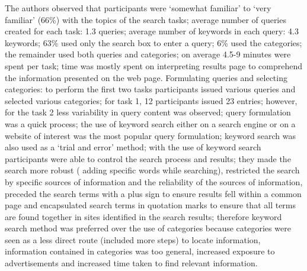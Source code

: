 \documentclass[]{article}
\begin{document}
The authors observed that participants were ‘somewhat familiar’ to ‘very familiar’ (66\%) with the topics of the search tasks; average number of queries created for each task: 1.3 queries; average number of keywords in each query: 4.3 keywords; 63\% used only the search box to enter a query; 6\% used the categories; the remainder used both queries and categories; on average 4.5-9 minutes were spent per task; time was mostly spent on interpreting results page to comprehend the information presented on the web page. Formulating queries and selecting categories: to perform the first two tasks participants issued various queries and selected various categories; for task 1, 12 participants issued 23 entries; however, for the task 2 less variability in query content was observed; query formulation was a quick process; the use of keyword search either on a search engine or on a website of interest was the most popular query formulation; keyword search was also used as a ‘trial and error’ method; with the use of keyword search participants were able to control the search process and results; they made the search more robust ( adding specific words while searching), restricted the search by specific sources of information and the reliability of the sources of information,  preceded the search terms with a plus sign to ensure results fell within a common page and encapsulated search terms in quotation marks to ensure that all terms are found together in sites identified in the search results; therefore keyword search method was preferred over the use of categories because categories were seen as a less direct route (included more steps) to locate information, information contained in categories was too general, increased exposure to advertisements and increased time taken to find relevant information.
    
\end{document}
